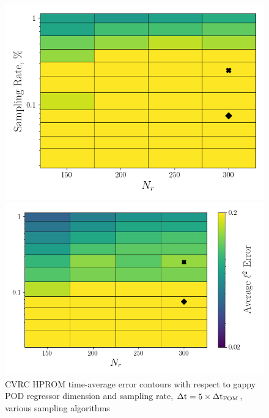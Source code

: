 \begin{figure}
	\begin{minipage}{0.46\linewidth}
		\includegraphics[width=0.99\linewidth]{Chapters/HPROMResults/Images/cvrc/deim/err_contour_gnat1_dt5e-7.png}
	\end{minipage}
	\begin{minipage}{0.53\linewidth}
		\includegraphics[width=0.99\linewidth]{Chapters/HPROMResults/Images/cvrc/deim/err_contour_gnat2_dt5e-7.png}
	\end{minipage}
	\caption{\label{fig:cvrcSampledROMErrContourDt5e-7}CVRC HPROM time-average error contours with respect to gappy POD regressor dimension and sampling rate, $\Delta \text{t} = 5 \times \Delta \text{t}_{\text{FOM}}$, various sampling algorithms}
\end{figure}

